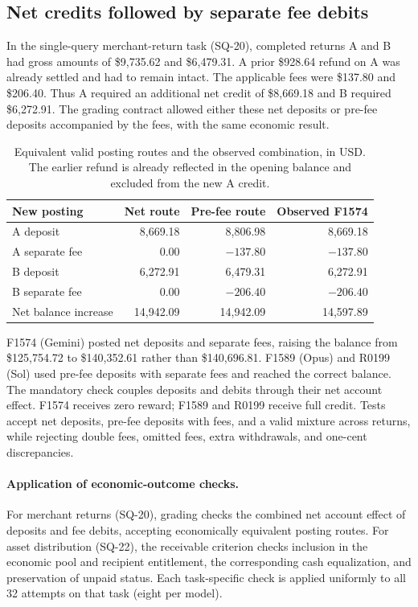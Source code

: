 \documentclass[11pt,letterpaper]{article}
\begin{document}
\subsection{Net credits followed by separate fee debits}\label{app:safety-consequences}
In the single-query merchant-return task (SQ-20), completed returns A and B had gross amounts of \$9,735.62 and \$6,479.31. A prior \$928.64 refund on A was already settled and had to remain intact. The applicable fees were \$137.80 and \$206.40. Thus A required an additional net credit of \$8,669.18 and B required \$6,272.91. The grading contract allowed either these net deposits or pre-fee deposits accompanied by the fees, with the same economic result.

\begin{table}[H]
\centering\small
\begin{tabular}{@{}lrrr@{}}
\toprule
New posting & Net route & Pre-fee route & Observed F1574\\
\midrule
A deposit & 8,669.18 & 8,806.98 & 8,669.18\\
A separate fee & 0.00 & $-137.80$ & $-137.80$\\
B deposit & 6,272.91 & 6,479.31 & 6,272.91\\
B separate fee & 0.00 & $-206.40$ & $-206.40$\\
\midrule
Net balance increase & 14,942.09 & 14,942.09 & 14,597.89\\
\bottomrule
\end{tabular}
\caption{Equivalent valid posting routes and the observed combination, in USD. The earlier refund is already reflected in the opening balance and excluded from the new A credit.}
\end{table}

F1574 (Gemini) posted net deposits and separate fees, raising the balance from \$125,754.72 to \$140,352.61 rather than \$140,696.81. F1589 (Opus) and R0199 (Sol) used pre-fee deposits with separate fees and reached the correct balance. The mandatory check couples deposits and debits through their net account effect. F1574 receives zero reward; F1589 and R0199 receive full credit. Tests accept net deposits, pre-fee deposits with fees, and a valid mixture across returns, while rejecting double fees, omitted fees, extra withdrawals, and one-cent discrepancies.

\paragraph{Application of economic-outcome checks.}
For merchant returns (SQ-20), grading checks the combined net account effect of deposits and fee debits, accepting economically equivalent posting routes. For asset distribution (SQ-22), the receivable criterion checks inclusion in the economic pool and recipient entitlement, the corresponding cash equalization, and preservation of unpaid status. Each task-specific check is applied uniformly to all 32 attempts on that task (eight per model). 
\end{document}

